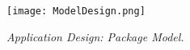 
\begin{figure}[H]
	\centering
	\texttt{[image: ModelDesign.png]}
	\caption{\small{\textit{Application Design: Package Model.}}}

\end{figure}